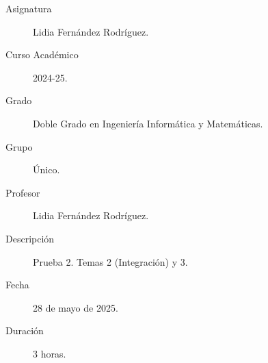 \documentclass[12pt]{article}
\begin{document}

    
    

    \begin{description}
        \item[Asignatura] Lidia Fernández Rodríguez.
        \item[Curso Académico] 2024-25.
        \item[Grado] Doble Grado en Ingeniería Informática y Matemáticas.
        \item[Grupo] Único.
        \item[Profesor] Lidia Fernández Rodríguez.
        \item[Descripción] Prueba 2. Temas 2 (Integración) y 3.
        \item[Fecha] 28 de mayo de 2025.
        \item[Duración] 3 horas.
    
    \end{description}
    \newpage
\end{document}

